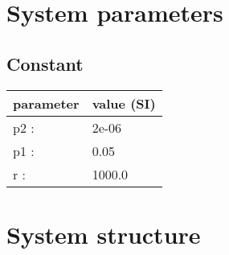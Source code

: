 \documentclass[11pt, oneside]{article}      %
\begin{document}
\section{System parameters}
%
%
\subsection{Constant}
%
\begin{center}
%
\begin{tabular}{ll}
%
\hline
parameter & value (SI)
\\ \hline
p2 :& 2e-06
\\
p1 :& 0.05
\\
r :& 1000.0
\\
\hline
\end{tabular}
%
\end{center}
%
\section{System structure}
%
\end{document}

